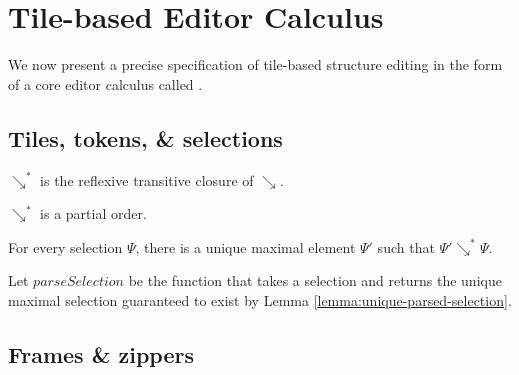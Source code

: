 
\section{Tile-based Editor Calculus}\label{sec:formalism}

We now present a precise specification of tile-based structure
editing in the form of a core editor calculus called \ty.


\subsection{Tiles, tokens, \& selections}








\begin{definition}
  $\searrow^*$ is the reflexive transitive
  closure of $\searrow$.
\end{definition}

\begin{lemma}
  $\searrow^*$ is a partial order.
\end{lemma}

\begin{lemma}\label{lemma:unique-parsed-selection}
  For every selection $\Psi$, there is a unique maximal
  element $\Psi'$ such that $\Psi'\searrow^*\Psi$.
\end{lemma}

\begin{definition}
  Let $parseSelection$ be the function that takes a selection
  and returns the unique maximal selection guaranteed to exist
  by Lemma \ref{lemma:unique-parsed-selection}.
\end{definition}


\subsection{Frames \& zippers}




